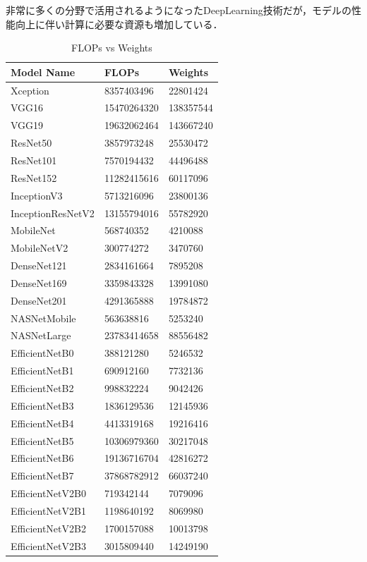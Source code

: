 非常に多くの分野で活用されるようになったDeepLearning技術だが，モデルの性能向上に伴い計算に必要な資源も増加している．

\begin{table}[H]
	\caption{FLOPs vs Weights}
	\label{table:flops_vs_weights}
	\centering
	\begin{tabular}{lll}
		\hline
		Model Name & FLOPs & Weights \\ 
		\hline \hline 
		Xception & 8357403496 & 22801424 \\ 
		VGG16 & 15470264320 & 138357544 \\ 
		VGG19 & 19632062464 & 143667240 \\ 
		ResNet50 & 3857973248 & 25530472 \\ 
		ResNet101 & 7570194432 & 44496488 \\ 
		ResNet152 & 11282415616 & 60117096 \\ 
		InceptionV3 & 5713216096 & 23800136 \\ 
		InceptionResNetV2 & 13155794016 & 55782920 \\ 
		MobileNet & 568740352 & 4210088 \\ 
		MobileNetV2 & 300774272 & 3470760 \\ 
		DenseNet121 & 2834161664 & 7895208 \\ 
		DenseNet169 & 3359843328 & 13991080 \\ 
		DenseNet201 & 4291365888 & 19784872 \\ 
		NASNetMobile & 563638816 & 5253240 \\ 
		NASNetLarge & 23783414658 & 88556482 \\ 
		EfficientNetB0 & 388121280 & 5246532 \\ 
		EfficientNetB1 & 690912160 & 7732136 \\ 
		EfficientNetB2 & 998832224 & 9042426 \\ 
		EfficientNetB3 & 1836129536 & 12145936 \\ 
		EfficientNetB4 & 4413319168 & 19216416 \\ 
		EfficientNetB5 & 10306979360 & 30217048 \\ 
		EfficientNetB6 & 19136716704 & 42816272 \\ 
		EfficientNetB7 & 37868782912 & 66037240 \\ 
		EfficientNetV2B0 & 719342144 & 7079096 \\ 
		EfficientNetV2B1 & 1198640192 & 8069980 \\ 
		EfficientNetV2B2 & 1700157088 & 10013798 \\ 
		EfficientNetV2B3 & 3015809440 & 14249190 \\ 

\end{tabular}
\end{table}
